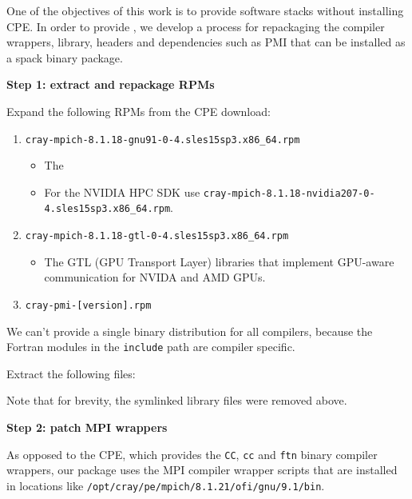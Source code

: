 One of the objectives of this work is to provide software stacks without installing CPE.
In order to provide \craympich, we develop a process for repackaging the compiler wrappers, library, headers and dependencies such as PMI that can be installed as a spack binary package.

\textbf{Step 1: extract and repackage RPMs}

Expand the following RPMs from the CPE download:

\begin{enumerate}
    \item \lstinline{cray-mpich-8.1.18-gnu91-0-4.sles15sp3.x86_64.rpm}
    \begin{itemize}
        \item The \
        \item For the NVIDIA HPC SDK use \lstinline{cray-mpich-8.1.18-nvidia207-0-4.sles15sp3.x86_64.rpm}.
    \end{itemize}
    \item \lstinline{cray-mpich-8.1.18-gtl-0-4.sles15sp3.x86_64.rpm}
    \begin{itemize}
        \item The GTL (GPU Transport Layer) libraries that implement GPU-aware communication for NVIDA and AMD GPUs.
    \end{itemize}
    \item \lstinline{cray-pmi-[version].rpm}
\end{enumerate}

We can't provide a single binary distribution for all compilers, because the Fortran modules in the \lstinline{include} path are compiler specific.

Extract the following files:



Note that for brevity, the symlinked library files were removed above.

\textbf{Step 2: patch MPI wrappers}

As opposed to the CPE, which provides the \lstinline{CC}, \lstinline{cc} and \lstinline{ftn} binary compiler wrappers, our package uses the MPI compiler wrapper scripts that are installed in locations like \lstinline{/opt/cray/pe/mpich/8.1.21/ofi/gnu/9.1/bin}.


